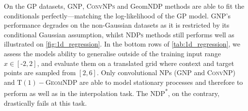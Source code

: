 On the GP datasets, {\scshape GNP}, {\scshape ConvNPs} and GeomNDP methods are able to fit the conditionals perfectly---matching the log-likelihood of the GP model.
	{\scshape GNP}'s performance degrades on the non-Gaussian datasets as it is restricted by its conditional Gaussian assumption, whilst {\scshape NDPs} methods still performs well as illustrated on \cref{fig:1d_regression}.
In the bottom rows of \cref{tab:1d_regression}, we assess the models ability to generalise outside of the training input range \(x \in [\text{-}2, 2]\), and evaluate them on a translated grid where context and target points are sampled from \([2,6]\).
Only convolutional NPs ({\scshape GNP} and {\scshape ConvNP}) and {\scshape \(\mathrm{T}(1)-\)GeomNDP } are able to model stationary processes and therefore to perform as well as in the interpolation task.
The {\scshape NDP\textsuperscript{*}}, on the contrary, drastically fails at this task.

